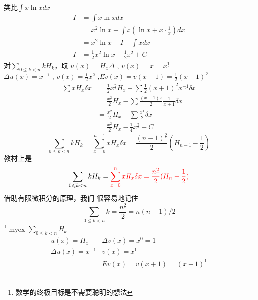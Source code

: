 \documentclass[mode=geye, chinesefont=founder]{elegantnote}
\newcommand{\fallingfactorial}[1]{%
  ^{\underline{#1}}%
}
\begin{document}
类比$ \int x\ln{x} dx $ 
\begin{align*}
    I &= \int x\ln{x} dx \\
    &= x^2 \ln{x} - \int x(\ln{x}+x\cdot \frac{1}{x})dx\\
    &= x^2 \ln{x} - I - \int xdx\\
    I &= \frac{1}{2}x^2 \ln{x} - \frac{1}{2}x^2 + C
\end{align*}
对$ \sum_{0\leqslant k< n} k H_k $，取 $ u(x)=H_x \Delta $ , $ v(x)=x = x\fallingfactorial{1}$\\
$ \Delta u(x) = x\fallingfactorial{-1} $ , $ v(x) = \frac{1}{2}x\fallingfactorial{2} $ ,$ Ev(x) = v(x+1)=\frac{1}{2}(x+1)\fallingfactorial{2} $ 
\begin{align*}
    \sum x H_x \delta x
    &= \frac{1}{2}x\fallingfactorial{2}H_x - \sum \frac{1}{2}(x+1)\fallingfactorial{2}x\fallingfactorial{-1} \delta x\\
    &= \frac{x\fallingfactorial{2}}{2}H_x - \sum \frac{(x+1)x}{2} \frac{1}{x+1} \delta x\\
    &= \frac{x\fallingfactorial{2}}{2}H_x - \sum \frac{x\fallingfactorial{1}}{2}\delta x\\
    &= \frac{x\fallingfactorial{2}}{2}H_x - \frac{1}{4}x\fallingfactorial{2}+C
\end{align*}
\begin{equation*}
    \sum_{0\leqslant k< n} k H_k 
    = \sum_{x=0}^{n-1}x H_x \delta x = \frac{(n-1)\fallingfactorial{2}}{2}(H_{n-1}-\frac{1}{2})
\end{equation*}
教材上是
\begin{equation*}
    \sum_{0\leqslant k< n} k H_k 
    = {\color{red}\sum_{x=0}^{n}x H_x \delta x = \frac{n\fallingfactorial{2}}{2}(H_{n}-\frac{1}{2})}
\end{equation*}
{\color{blue}借助有限微积分的原理，我们
很容易地记住}
\begin{equation}
    \sum_{0\leqslant k<n}k = \frac{n\fallingfactorial{2}}{2} = n(n-1)/2
\end{equation}
\footnote{数学的终极目标是不需要聪明的想法}
myex $ \sum_{0\leqslant k < n}H_k $ 
\begin{equation*}
    \begin{array}{ll}
        u(x) = H_x & \Delta v(x) = x\fallingfactorial{0}=1 \\
        \Delta u(x) = x\fallingfactorial{-1} & v(x) = x\fallingfactorial{1} \\
        & E v(x) = v(x+1) = (x+1)\fallingfactorial{1}\\
    \end{array}
\end{equation*}
\end{document}
